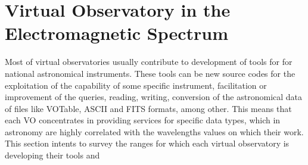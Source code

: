\section{Virtual Observatory in the Electromagnetic Spectrum}

Most of virtual observatories usually contribute to development of tools for
for national astronomical instruments. These tools can be new source codes for
the exploitation of the capability of some specific instrument, facilitation or
improvement of the queries, reading, writing, conversion of the astronomical
data of files like VOTable, ASCII and FITS formats, among other. 
This means that each VO concentrates in providing services for specific
data types, which in astronomy are highly correlated with the wavelengths values
on which their work. This section intents to survey the ranges for which 
each virtual observatory is developing their tools and 

